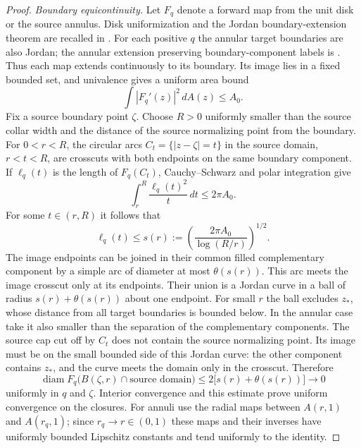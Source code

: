 \begin{proof}
\emph{Boundary equicontinuity.}
Let $F_q$ denote a forward map from the unit disk or the source
annulus. Disk uniformization and the Jordan boundary-extension theorem
are recalled in \cite[Theorems~1.2.1--1.2.2]{Papamichael2008}.
For each positive $q$ the annular target boundaries are also Jordan;
the annular extension preserving boundary-component labels is
\cite[Theorem~1.3.2]{Papamichael2008}.
Thus each map extends continuously to its boundary. Its image lies in
a fixed bounded set, and univalence gives a uniform area bound
\[
                      \int |F_q'(z)|^2\,dA(z)\le A_0.
\]
Fix a source boundary point $\zeta$.  Choose $R>0$ uniformly smaller
than the source collar width and the distance of the source normalizing
point from the boundary.  For $0<r<R$, the circular arcs
$C_t=\{|z-\zeta|=t\}$ in the source domain, $r<t<R$, are crosscuts
with both endpoints on the same boundary component.  If
$\ell_q(t)$ is the length of $F_q(C_t)$, Cauchy--Schwarz and polar
integration give
\[
 \int_r^R \frac{\ell_q(t)^2}{t}\,dt\le 2\pi A_0.
\]
For some $t\in(r,R)$ it follows that
\begin{equation}\label{if:short-crosscut}
 \ell_q(t)\le s(r):=
       \left(\frac{2\pi A_0}{\log(R/r)}\right)^{1/2}.
\end{equation}
The image endpoints can be joined in their common filled complementary
component by a simple arc of diameter at most $\theta(s(r))$.
This arc meets the image crosscut only at its endpoints.  Their union
is a Jordan curve in a ball of radius $s(r)+\theta(s(r))$ about one
endpoint.  For small $r$ the ball excludes $z_*$, whose distance from
all target boundaries is bounded below.  In the annular case take it
also smaller than the separation of the complementary components.
The source cap cut off by $C_t$ does not contain the source normalizing
point.  Its image must be on the small bounded side of this Jordan
curve: the other component contains $z_*$, and the curve meets the
domain only in the crosscut.  Therefore
\begin{equation}\label{if:boundary-modulus}
 \operatorname{diam}F_q\bigl(B(\zeta,r)\cap\text{source domain}\bigr)
       \le 2\bigl[s(r)+\theta(s(r))\bigr]\longrightarrow0
\end{equation}
uniformly in $q$ and $\zeta$.  Interior convergence and this estimate
prove uniform convergence on the closures.  For annuli use the radial
maps between $A(r,1)$ and $A(r_q,1)$; since $r_q\to r\in(0,1)$ these
maps and their inverses have uniformly bounded Lipschitz constants
and tend uniformly to the identity.


\end{proof}
